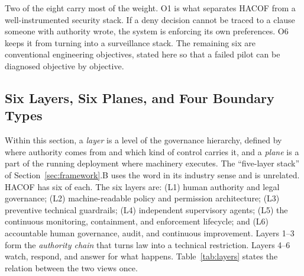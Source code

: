 \documentclass{ieeeaccess}
\newcommand{\hacof}{HACOF}
\begin{document}
Two of the eight carry most of the weight. O1 is what separates \hacof{} from a well-instrumented security stack. If a deny decision cannot be traced to a clause someone with authority wrote, the system is enforcing its own preferences. O6 keeps it from turning into a surveillance stack. The remaining six are conventional engineering objectives, stated here so that a failed pilot can be diagnosed objective by objective.

\subsection{Six Layers, Six Planes, and Four Boundary Types}
\label{sec:hacof-arch}

Within this section, a \textit{layer} is a level of the governance hierarchy, defined by where authority comes from and which kind of control carries it, and a \textit{plane} is a part of the running deployment where machinery executes. The ``five-layer stack'' of Section~\ref{sec:framework}.B uses the word in its industry sense and is unrelated. \hacof{} has six of each. The six layers are: (L1) human authority and legal governance; (L2) machine-readable policy and permission architecture; (L3) preventive technical guardrails; (L4) independent supervisory agents; (L5) the continuous monitoring, containment, and enforcement lifecycle; and (L6) accountable human governance, audit, and continuous improvement. Layers 1--3 form the \textit{authority chain} that turns law into a technical restriction. Layers 4--6 watch, respond, and answer for what happens. Table~\ref{tab:layers} states the relation between the two views once.
\end{document}
